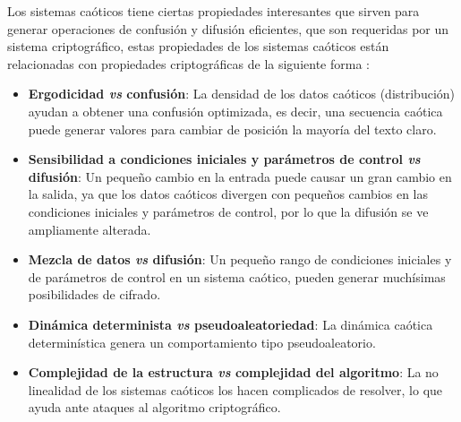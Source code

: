 Los sistemas caóticos tiene ciertas propiedades interesantes que sirven para generar operaciones de confusión y difusión eficientes, que son requeridas por un sistema criptográfico, estas propiedades de los sistemas caóticos están relacionadas con propiedades criptográficas de la siguiente forma \cite{AyL_2006}:
\begin{itemize}
\item \textbf{Ergodicidad \textit{vs} confusión}: La densidad de los datos caóticos (distribución) ayudan a obtener una confusión optimizada, es decir, una secuencia caótica puede generar valores para cambiar de posición la mayoría del texto claro. 
\item \textbf{Sensibilidad a condiciones iniciales y parámetros de control \textit{vs} difusión}: Un pequeño cambio en la entrada puede causar un gran cambio en la salida, ya que los datos caóticos divergen con pequeños cambios en las condiciones iniciales y parámetros de control, por lo que la difusión se ve ampliamente alterada.
\item \textbf{Mezcla de datos \textit{vs} difusión}: Un pequeño rango de condiciones iniciales y de parámetros de control en un sistema caótico, pueden generar muchísimas posibilidades de cifrado. 
\item \textbf{Dinámica determinista \textit{vs} pseudoaleatoriedad}: La dinámica caótica determinística genera un comportamiento tipo pseudoaleatorio.
\item \textbf{Complejidad de la estructura \textit{vs} complejidad del algoritmo}: La no linealidad de los sistemas caóticos los hacen complicados de resolver, lo que ayuda ante ataques al algoritmo criptográfico. \\
\end{itemize}

